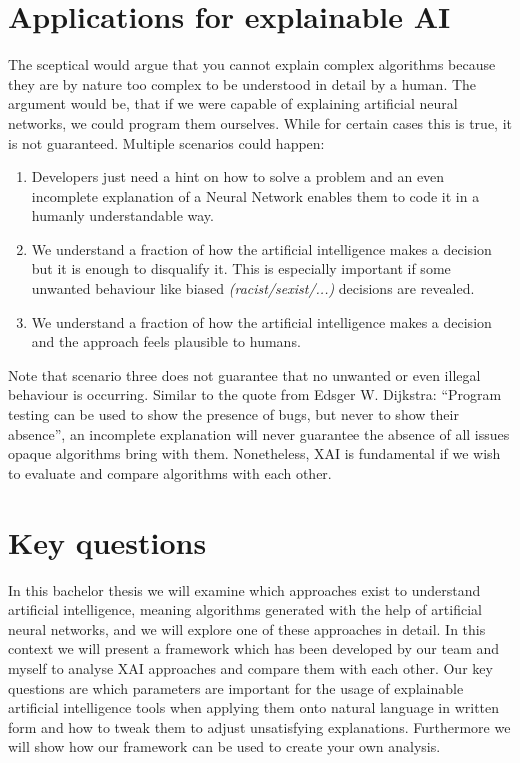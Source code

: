 \section{Applications for explainable AI}

The sceptical would argue that you cannot explain complex algorithms because they are by nature too complex to be understood in detail by a human. The argument would be, that if we were capable of explaining artificial neural networks, we could program them ourselves. While for certain cases this is true, it is not guaranteed. Multiple scenarios could happen:

\begin{enumerate}
    \item Developers just need a hint on how to solve a problem and an even incomplete explanation of a Neural Network enables them to code it in a humanly understandable way.
    \item We understand a fraction of how the artificial intelligence makes a decision but it is enough to disqualify it. This is especially important if some unwanted behaviour like biased \textit{(racist/sexist/...)} decisions are revealed.
    \item We understand a fraction of how the artificial intelligence makes a decision and the approach feels plausible to humans.
\end{enumerate}

Note that scenario three does not guarantee that no unwanted or even illegal behaviour is occurring. Similar to the quote from Edsger W. Dijkstra: \enquote{Program testing can be used to show the presence of bugs, but never to show their absence}, an incomplete explanation will never guarantee the absence of all issues opaque algorithms bring with them.
Nonetheless, XAI is fundamental if we wish to evaluate and compare algorithms with each other.


\section{Key questions}

In this bachelor thesis we will examine which approaches exist to understand artificial intelligence, meaning algorithms generated with the help of artificial neural networks, and we will explore one of these approaches in detail. In this context we will present a framework which has been developed by our team and myself to analyse XAI approaches and compare them with each other. Our key questions are which parameters are important for the usage of explainable artificial intelligence tools when applying them onto natural language in written form and how to tweak them to adjust unsatisfying explanations. Furthermore we will show how our framework can be used to create your own analysis.
